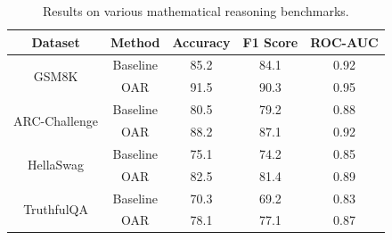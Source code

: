 \documentclass{article}
\begin{document}
        \begin{table}[h]
        \centering
        \begin{tabular}{|c|c|c|c|c|}
        \hline
        \textbf{Dataset} & \textbf{Method} & \textbf{Accuracy} & \textbf{F1 Score} & \textbf{ROC-AUC} \\
        \hline
        \multirow{2}{*}{GSM8K} & Baseline & 85.2 & 84.1 & 0.92 \\
        \cline{2-5}
        & OAR & 91.5 & 90.3 & 0.95 \\
        \hline
        \multirow{2}{*}{ARC-Challenge} & Baseline & 80.5 & 79.2 & 0.88 \\
        \cline{2-5}
        & OAR & 88.2 & 87.1 & 0.92 \\
        \hline
        \multirow{2}{*}{HellaSwag} & Baseline & 75.1 & 74.2 & 0.85 \\
        \cline{2-5}
        & OAR & 82.5 & 81.4 & 0.89 \\
        \hline
        \multirow{2}{*}{TruthfulQA} & Baseline & 70.3 & 69.2 & 0.83 \\
        \cline{2-5}
        & OAR & 78.1 & 77.1 & 0.87 \\
        \hline
        \end{tabular}
        \caption{Results on various mathematical reasoning benchmarks.}
        \label{tab:results}
        \end{table}
        
        
\end{document}
